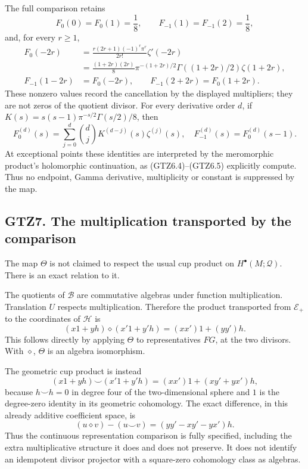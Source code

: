 The full comparison retains \[
F_0(0)=F_0(1)=\frac18,\qquad
F_{-1}(1)=F_{-1}(2)=\frac18,
\tag{GTZ6.4}
\] and, for every \(r\ge1\), \[
\begin{aligned}
F_0(-2r)
&=\frac{r(2r+1)(-1)^r\pi^r}{2r!}\zeta'(-2r)\\
&=\frac{(1+2r)(2r)}8\pi^{-(1+2r)/2}
\Gamma((1+2r)/2)\zeta(1+2r),\\
F_{-1}(1-2r)&=F_0(-2r),\qquad
F_{-1}(2+2r)=F_0(1+2r).
\end{aligned}
\tag{GTZ6.5}
\] These nonzero values record the cancellation by the displayed
multipliers; they are not zeros of the quotient divisor. For every
derivative order \(d\), if \(K(s)=s(s-1)\pi^{-s/2}\Gamma(s/2)/8\), then
\[
F_0^{(d)}(s)=\sum_{j=0}^{d}\binom dj K^{(d-j)}(s)\zeta^{(j)}(s),
\quad
F_{-1}^{(d)}(s)=F_0^{(d)}(s-1).
\tag{GTZ6.6}
\] At exceptional points these identities are interpreted by the
meromorphic product's holomorphic continuation, as (GTZ6.4)--(GTZ6.5)
explicitly compute. Thus no endpoint, Gamma derivative, multiplicity or
constant is suppressed by the map.

\subsection{GTZ7. The multiplication transported by the
comparison}\label{gtz7.-the-multiplication-transported-by-the-comparison}

The map \(\Theta\) is not claimed to respect the usual cup product on
\(H^\bullet(M;\mathcal Q)\). There is an exact relation to it.

The quotients of \(\mathcal B\) are commutative algebras under function
multiplication. Translation \(U\) respects multiplication. Therefore the
product transported from \(\mathcal E_+\) to the coordinates of
\(\mathcal H\) is \[
(x1+yh)\mathbin{\diamond}(x'1+y'h)
=(xx')1+(yy')h.
\tag{GTZ7.1}
\] This follows directly by applying \(\Theta\) to representatives
\(F G\), at the two divisors. With \(\diamond\), \(\Theta\) is an
algebra isomorphism.

The geometric cup product is instead \[
(x1+yh)\smile(x'1+y'h)
=(xx')1+(xy'+yx')h,
\tag{GTZ7.2}
\] because \(h\smile h=0\) in degree four of the two-dimensional sphere
and \(1\) is the degree-zero identity in its geometric cohomology. The
exact difference, in this already additive coefficient space, is \[
(u\diamond v)-(u\smile v)
=(yy'-xy'-yx')h.
\tag{GTZ7.3}
\] Thus the continuous representation comparison is fully specified,
including the extra multiplicative structure it does and does not
preserve. It does not identify an idempotent divisor projector with a
square-zero cohomology class as algebras.

